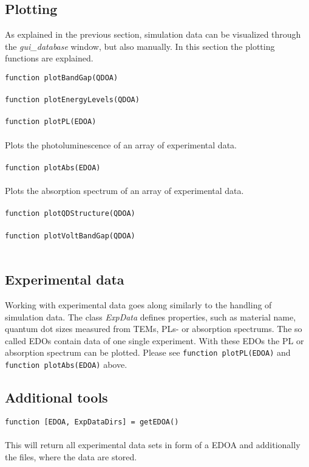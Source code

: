	\subsection{Plotting} \label{sec:Plotting} 
			As explained in the previous section, simulation data can be visualized  through the {\it gui\_database} window, but also manually.
			In this section the plotting  functions are explained.
			
			\lstinline{function plotBandGap(QDOA)} \\ \\
				
			
			\lstinline{function plotEnergyLevels(QDOA)} \\ \\
			\lstinline{function plotPL(EDOA)} \\ \\
				 Plots the photoluminescence of an array of experimental data. \\ \\
			\lstinline{function plotAbs(EDOA)} \\ \\
				 Plots the absorption spectrum of an array of experimental data. \\ \\
			\lstinline{function plotQDStructure(QDOA)} \\ \\
			\lstinline{function plotVoltBandGap(QDOA)} \\ \\
			
	\subsection{Experimental data}
		Working with experimental data goes along similarly to the handling of simulation data. The class {\it ExpData} defines properties, such as material name, quantum
		dot sizes measured from \glspl{TEM}, \glspl{PL}- or absorption spectrums. The so called \glspl{EDO} contain data of one single experiment. With these \glspl{EDO}
		the \gls{PL} or absorption spectrum can be plotted. Please see \lstinline{function plotPL(EDOA)} and \lstinline{function plotAbs(EDOA)} above.		
			
	\subsection{Additional tools} \label{sec:addTools}
			\lstinline{function [EDOA, ExpDataDirs] = getEDOA()} \\ \\
				This will return all experimental data sets in form of a EDOA and additionally the files, where the data are stored.
				
